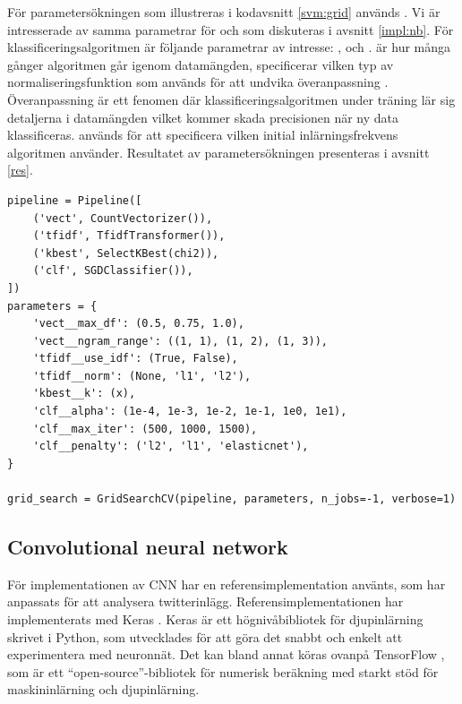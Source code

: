 \documentclass{kaumasters} %
\begin{document}
För parametersökningen som illustreras i kodavsnitt \ref{svm:grid} används . Vi är intresserade av samma parametrar för  och  som diskuteras i avsnitt \ref{impl:nb}. För klassificeringsalgoritmen  är följande parametrar av intresse: ,  och .  är hur många gånger algoritmen går igenom datamängden,  specificerar vilken typ av normaliseringsfunktion som används för att undvika överanpassning \cite{svm:007}. Överanpassning är ett fenomen där klassificeringsalgoritmen under träning lär sig detaljerna i datamängden vilket kommer skada precisionen när ny data klassificeras.
 används för att specificera vilken initial inlärningsfrekvens algoritmen använder. Resultatet av parametersökningen presenteras i avsnitt \ref{res}.

\begin{lstlisting}[style=mypython,caption={Kod som används till parametersökning för SVM.},label=svm:grid]
pipeline = Pipeline([
    ('vect', CountVectorizer()),
    ('tfidf', TfidfTransformer()),
    ('kbest', SelectKBest(chi2)),
    ('clf', SGDClassifier()),
])
parameters = {
    'vect__max_df': (0.5, 0.75, 1.0),
    'vect__ngram_range': ((1, 1), (1, 2), (1, 3)),
    'tfidf__use_idf': (True, False),
    'tfidf__norm': (None, 'l1', 'l2'),
    'kbest__k': (x),
    'clf__alpha': (1e-4, 1e-3, 1e-2, 1e-1, 1e0, 1e1),
    'clf__max_iter': (500, 1000, 1500),
    'clf__penalty': ('l2', 'l1', 'elasticnet'),
}

grid_search = GridSearchCV(pipeline, parameters, n_jobs=-1, verbose=1)
\end{lstlisting}

\subsection{Convolutional neural network}\label{impl:cnn}
För implementationen av CNN har en referensimplementation använts, som har anpassats för att analysera twitterinlägg. Referensimplementationen har implementerats med Keras \cite{impcnn:004}. Keras är ett högnivåbibliotek för djupinlärning skrivet i Python, som utvecklades för att göra det snabbt och enkelt att experimentera med neuronnät. Det kan bland annat köras ovanpå TensorFlow \cite{impcnn:005}, som är ett “open-source”-bibliotek för numerisk beräkning med starkt stöd för maskininlärning och djupinlärning. 
\end{document}
